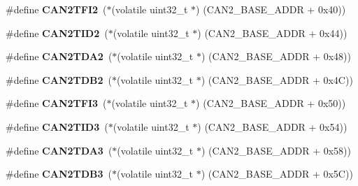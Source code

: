\begin{DoxyCompactItemize}
\item 
\mbox{\label{group__lpc24xx__regs_gafd562ee58b6aded2fe1287a58f2e4547}} 
\#define {\bfseries C\+A\+N2\+T\+F\+I2}~($\ast$(volatile uint32\+\_\+t $\ast$) (C\+A\+N2\+\_\+\+B\+A\+S\+E\+\_\+\+A\+D\+DR + 0x40))
\item 
\mbox{\label{group__lpc24xx__regs_gaa450cd8b94c199f456f13168edea2efb}} 
\#define {\bfseries C\+A\+N2\+T\+I\+D2}~($\ast$(volatile uint32\+\_\+t $\ast$) (C\+A\+N2\+\_\+\+B\+A\+S\+E\+\_\+\+A\+D\+DR + 0x44))
\item 
\mbox{\label{group__lpc24xx__regs_ga8acb428174a844a335891f3fdda9055e}} 
\#define {\bfseries C\+A\+N2\+T\+D\+A2}~($\ast$(volatile uint32\+\_\+t $\ast$) (C\+A\+N2\+\_\+\+B\+A\+S\+E\+\_\+\+A\+D\+DR + 0x48))
\item 
\mbox{\label{group__lpc24xx__regs_ga029de0a7619a1c7571827a28ab1a2c57}} 
\#define {\bfseries C\+A\+N2\+T\+D\+B2}~($\ast$(volatile uint32\+\_\+t $\ast$) (C\+A\+N2\+\_\+\+B\+A\+S\+E\+\_\+\+A\+D\+DR + 0x4\+C))
\item 
\mbox{\label{group__lpc24xx__regs_ga625c98b24e14132c724c571a813d0321}} 
\#define {\bfseries C\+A\+N2\+T\+F\+I3}~($\ast$(volatile uint32\+\_\+t $\ast$) (C\+A\+N2\+\_\+\+B\+A\+S\+E\+\_\+\+A\+D\+DR + 0x50))
\item 
\mbox{\label{group__lpc24xx__regs_ga4389a61fed25c290ecb3b0b901bd2567}} 
\#define {\bfseries C\+A\+N2\+T\+I\+D3}~($\ast$(volatile uint32\+\_\+t $\ast$) (C\+A\+N2\+\_\+\+B\+A\+S\+E\+\_\+\+A\+D\+DR + 0x54))
\item 
\mbox{\label{group__lpc24xx__regs_gaa635a36c2025ce0fecd1dfca15c0fc26}} 
\#define {\bfseries C\+A\+N2\+T\+D\+A3}~($\ast$(volatile uint32\+\_\+t $\ast$) (C\+A\+N2\+\_\+\+B\+A\+S\+E\+\_\+\+A\+D\+DR + 0x58))
\item 
\mbox{\label{group__lpc24xx__regs_gad89870813a6b5e10609700abc27077d3}} 
\#define {\bfseries C\+A\+N2\+T\+D\+B3}~($\ast$(volatile uint32\+\_\+t $\ast$) (C\+A\+N2\+\_\+\+B\+A\+S\+E\+\_\+\+A\+D\+DR + 0x5\+C))
\item 

\end{DoxyCompactItemize}
